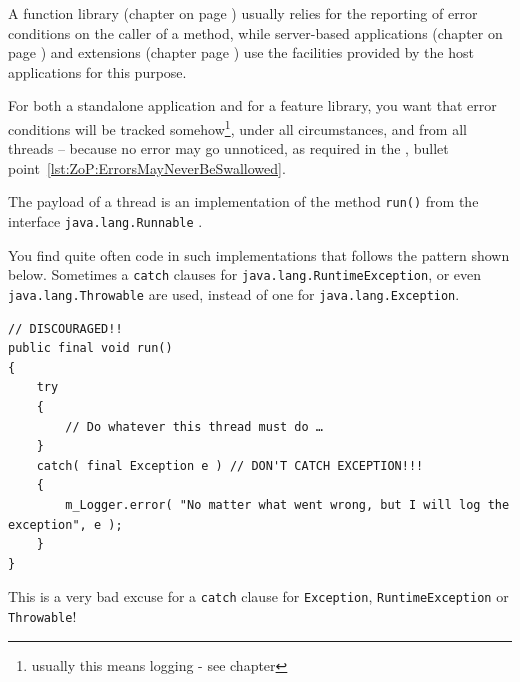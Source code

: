 A function library (chapter  on page \pageref{sec:FunctionLibrary}) usually relies for the reporting of error conditions on the caller of a method, while server-based applications (chapter  on page \pageref{sec:ServerbasedApplication}) and extensions (chapter  page \pageref{sec:Extension}) use the facilities provided by the host applications for this purpose.

For both a standalone application and for a feature library, you want that error conditions will be tracked somehow\footnote{usually this means logging - see chapter }, under all circumstances, and from all threads – because no error may go unnoticed, as required in the \ngref, bullet point~\ref{lst:ZoP:ErrorsMayNeverBeSwallowed}.

\bigskip

The payload of a thread is an implementation of the method \lstinline|run()| \autocite{ORACLE_DOC_RUNNABLE:run} from the interface \lstinline|java.lang.Runnable| \autocite{ORACLE_DOC_RUNNABLE_INTERFACE}. 

You find quite often code in such implementations that follows the pattern shown below. Sometimes a \lstinline|catch| clauses for \lstinline|java.lang.RuntimeException|, or even \lstinline|java.lang.Throwable| are used, instead of one for \lstinline|java.lang.Exception|.

\begin{lstlisting}
// DISCOURAGED!!
public final void run()
{
    try
    {
        // Do whatever this thread must do …
    }
    catch( final Exception e ) // DON'T CATCH EXCEPTION!!!
    {
        m_Logger.error( "No matter what went wrong, but I will log the exception", e );
    }
} 
\end{lstlisting}

This is a very bad excuse for a \lstinline|catch| clause for \lstinline|Exception|, \lstinline|RuntimeException| or \lstinline|Throwable|!

